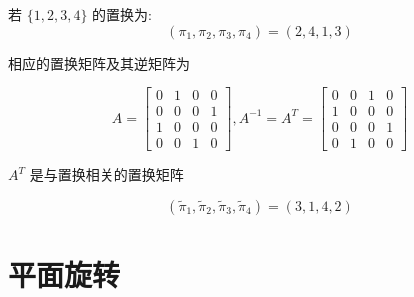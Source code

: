 \begin{example}
    若 $ \{1,2,3,4\} $ 的置换为:
$$
\left(\pi_{1}, \pi_{2}, \pi_{3}, \pi_{4}\right)=(2,4,1,3)
$$

相应的置换矩阵及其逆矩阵为

$$ A=\left[\begin{array}{llll}0 & 1 & 0 & 0 \\ 0 & 0 & 0 & 1 \\ 1 & 0 & 0 & 0 \\ 0 & 0 & 1 & 0\end{array}\right] , A^{-1}=A^{T}=\left[\begin{array}{llll}0 & 0 & 1 & 0 \\ 1 & 0 & 0 & 0 \\ 0 & 0 & 0 & 1 \\ 0 & 1 & 0 & 0\end{array}\right] $$

$ A^{T} $ 是与置换相关的置换矩阵

$$
\left(\tilde{\pi}_{1}, \tilde{\pi}_{2}, \tilde{\pi}_{3}, \tilde{\pi}_{4}\right)=(3,1,4,2)
$$
\end{example}

\section{平面旋转}


